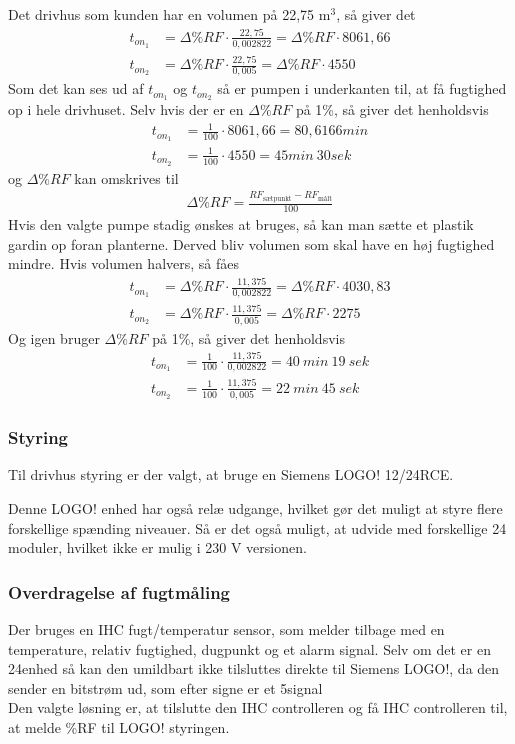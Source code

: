 Det drivhus som kunden har en volumen på 22,75 m$^3$, så giver det
\begin{align}
    t_{on_{1}} & = \Delta\%RF\cdot\frac{ 22,75 }{0,002822} = \Delta\%RF\cdot8061,66 \\
    t_{on_{2}} & = \Delta\%RF\cdot\frac{ 22,75 }{0,005} = \Delta\%RF\cdot4550 
\end{align}
Som det kan ses ud af $t_{on_{1}}$ og $t_{on_{2}}$ så er pumpen i underkanten til, at få fugtighed op i hele drivhuset.
Selv hvis der er en $\Delta\%RF$ på 1\%, så giver det henholdsvis
\begin{align}
    t_{on_{1}} &= \frac{1}{100} \cdot 8061,66 = 80,6166 min \\
    t_{on_{2}} &= \frac{1}{100} \cdot 4550 = 45 min \ 30 sek
\end{align}
og $\Delta\%RF$ kan omskrives til 
\begin{align}
    \Delta\%RF = \frac{ RF_{\text{sætpunkt}} - RF_{\text{målt}} }{ 100 }
\end{align}
Hvis den valgte pumpe stadig ønskes at bruges, så kan man sætte et plastik gardin op foran planterne.
Derved bliv volumen som skal have en høj fugtighed mindre. Hvis volumen halvers, så fåes
\begin{align}
    t_{on_{1}} & = \Delta\%RF\cdot\frac{ 11,375 }{0,002822} = \Delta\%RF\cdot4030,83 \\
    t_{on_{2}} & = \Delta\%RF\cdot\frac{ 11,375 }{0,005} = \Delta\%RF\cdot2275 
\end{align}
Og igen bruger $\Delta\%RF$ på 1\%, så giver det henholdsvis
\begin{align}
    t_{on_{1}} & = \frac{1}{100}\cdot\frac{ 11,375 }{0,002822} = 40 \ min \ 19 \ sek\\
    t_{on_{2}} & = \frac{1}{100}\cdot\frac{ 11,375 }{0,005} = 22 \ min \ 45 \ sek
\end{align}

\subsubsection{Styring}
Til drivhus styring er der valgt, at bruge en Siemens LOGO! 12/24RCE. 

Denne LOGO! enhed har også relæ udgange, 
hvilket gør det muligt at styre flere forskellige spænding niveauer.
Så er det også muligt, at udvide med forskellige 24 \vdc moduler, hvilket ikke er mulig i 230 V versionen.

\subsubsection{Overdragelse af fugtmåling}
Der bruges en IHC fugt/temperatur sensor, som melder tilbage med en temperature, relativ fugtighed, dugpunkt og et alarm signal.
Selv om det er en 24\vdc enhed så kan den umildbart ikke tilsluttes direkte til Siemens LOGO!, 
da den sender en bitstrøm ud, som efter signe er et 5\vdc signal\\
Den valgte løsning er, at tilslutte den IHC controlleren og få IHC controlleren til, at melde \%RF til LOGO! styringen. \\

